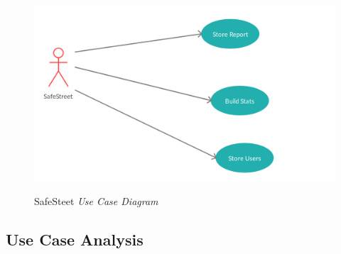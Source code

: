 \documentclass[../RASD.tex]{subfiles}
\begin{document}
                    \begin{figure}[H]
                        \centering
                        \includegraphics[scale = 1]{assets/safeStreetUC.png}\\[1.6 cm]
                        \caption[SafeStreets \textit{Use Case Diagram}]{SafeSteet \textit{Use Case Diagram}}
                    \end{figure}
                    \newpage
            \subsection{Use Case Analysis}\label{subsec:use-case-analysis}
                
            \newpage
\end{document}

